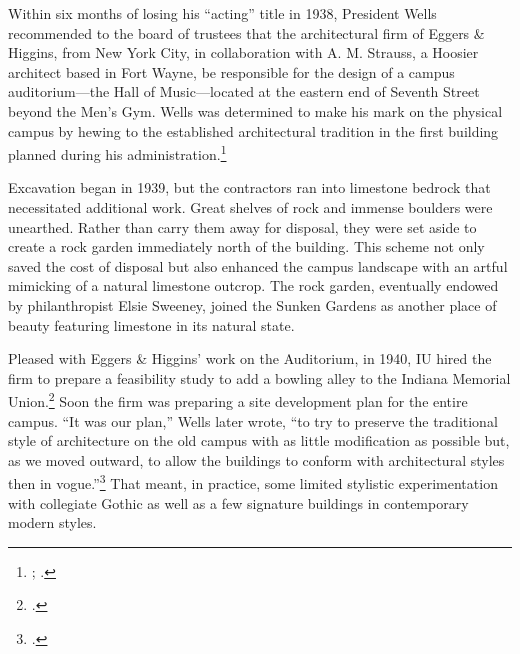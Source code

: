 \documentclass[
  american,
  letterpaper,
]{scrreprt}
\begin{document}
Within six months of losing his ``acting'' title in 1938, President
Wells recommended to the board of trustees that the architectural firm
of Eggers \& Higgins, from New York City, in collaboration with A. M.
Strauss, a Hoosier architect based in Fort Wayne, be responsible for the
design of a campus auditorium---the Hall of Music---located at the
eastern end of Seventh Street beyond the Men's Gym. Wells was determined
to make his mark on the physical campus by hewing to the established
architectural tradition in the first building planned during his
administration.\footnote{; .}

Excavation began in 1939, but the contractors ran into limestone bedrock
that necessitated additional work. Great shelves of rock and immense
boulders were unearthed. Rather than carry them away for disposal, they
were set aside to create a rock garden immediately north of the
building. This scheme not only saved the cost of disposal but also
enhanced the campus landscape with an artful mimicking of a natural
limestone outcrop. The rock garden, eventually endowed by philanthropist
Elsie Sweeney, joined the Sunken Gardens as another place of beauty
featuring limestone in its natural state.

Pleased with Eggers \& Higgins' work on the Auditorium, in 1940, IU
hired the firm to prepare a feasibility study to add a bowling alley to
the Indiana Memorial Union.\footnote{.}
Soon the firm was preparing a site development plan for the entire
campus. ``It was our plan,'' Wells later wrote, ``to try to preserve the
traditional style of architecture on the old campus with as little
modification as possible but, as we moved outward, to allow the
buildings to conform with architectural styles then in
vogue.''\footnote{.} That meant, in practice, some limited stylistic experimentation
with collegiate Gothic as well as a few signature buildings in
contemporary modern styles.
\end{document}
